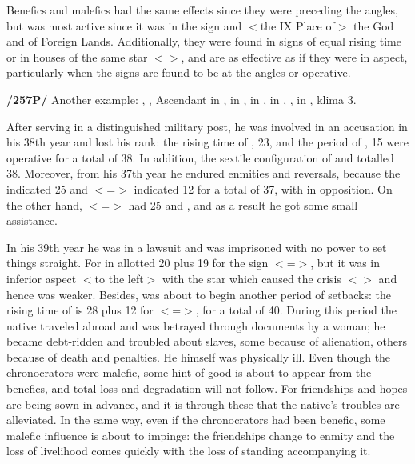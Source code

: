 Benefics and malefics had the same effects since they were preceding the angles, but \Jupiter\xspace was most active since it was in the sign and $<$the IX Place of$>$ the God and of Foreign Lands. Additionally, they were found in signs of equal rising time or in houses of the same star $<$\Mercury$>$, and are as effective as if they were in aspect, particularly when the signs are found to be at
the angles or operative.

\textbf{/257P/} Another example: \Sun, \Jupiter, Ascendant in \Cancer, \Moon\xspace in \Sagittarius, \Saturn\xspace in \Gemini,
\Mars\xspace in \Taurus, \Venus, \Mercury\xspace in \Leo, klima 3.

After serving in a distinguished military post, he was involved in an accusation in his 38th year and lost his rank: the rising time of \Taurus, 23, and the period of \Mars, 15 were operative for a total of 38. In addition, the sextile configuration of \Saturn\xspace and \Venus\xspace totalled 38. Moreover, from his 37th year he endured enmities and reversals, because the \Moon\xspace indicated 25 and \Sagittarius\xspace $<$=\Jupiter$>$ indicated 12 for a total of 37, with \Saturn\xspace in opposition. On the other hand, \Cancer\xspace $<$=\Moon$>$ had 25 and \Jupiter\xspace 12, and as a result he got some small assistance. 

In his 39th year he was in a lawsuit and was imprisoned with no power to set things straight. For \Mercury\xspace in \Leo allotted 20
plus 19 for the sign $<$=\Sun$>$, but it was in inferior aspect $<$\Sextile to the left$>$ with the star which caused the crisis $<$\Saturn$>$ and hence was weaker. Besides, \Saturn\xspace was about to begin another period of setbacks: the rising time of \Gemini\xspace is 28 plus 12 for \Sagittarius\xspace $<$=\Jupiter$>$, for a total of 40. During this period the native traveled abroad and was betrayed through documents by a woman; he became debt-ridden and troubled about slaves, some because of alienation, others because of death and penalties. He himself was physically ill. Even though the chronocrators were malefic, some hint of good is about to appear from the benefics, and total loss and degradation will not follow. For friendships and hopes are being sown in advance, and it is through these that the native’s troubles are alleviated. In the same way, even if the chronocrators had been benefic, some malefic influence is about to impinge: the friendships change to enmity and the loss of livelihood comes quickly with the loss of standing accompanying it. 

